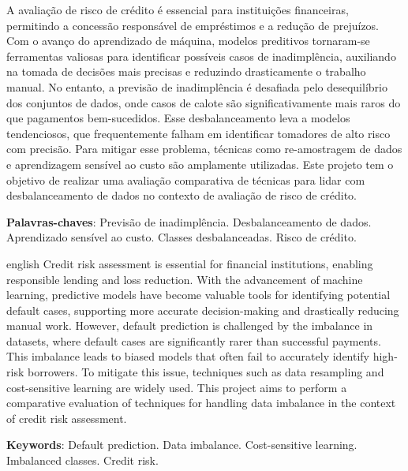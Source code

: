 
\setlength{\absparsep}{18pt} %
\begin{resumo}
  A avaliação de risco de crédito é essencial para instituições financeiras,
  permitindo a concessão responsável de empréstimos e a redução de
  prejuízos. Com
  o avanço do aprendizado de máquina, modelos preditivos tornaram-se
  ferramentas valiosas para identificar possíveis casos de
  inadimplência, auxiliando
  na tomada de decisões mais precisas e reduzindo drasticamente o
  trabalho manual.
  No entanto, a previsão de inadimplência é desafiada pelo
  desequilíbrio dos conjuntos
  de dados, onde casos de calote são significativamente mais raros do que
  pagamentos bem-sucedidos. Esse desbalanceamento leva a modelos tendenciosos,
  que frequentemente falham em identificar tomadores de alto risco com
  precisão. Para mitigar esse problema, técnicas como re-amostragem de dados e
  aprendizagem sensível ao custo são amplamente utilizadas. Este projeto tem o
  objetivo de realizar uma avaliação comparativa de técnicas para
  lidar com desbalanceamento
  de dados no contexto de avaliação de risco de crédito.

  \textbf{Palavras-chaves}: Previsão de inadimplência. Desbalanceamento de
  dados. Aprendizado sensível ao custo. Classes desbalanceadas. Risco
  de crédito.
\end{resumo}

\begin{resumo}
  [Abstract]
  \begin{otherlanguage*}
    {english} Credit risk assessment is essential for financial institutions,
    enabling responsible lending and loss reduction. With the advancement of
    machine learning, predictive models have become valuable tools for
    identifying potential default cases, supporting more accurate
    decision-making
    and drastically reducing manual work. However, default prediction
    is challenged
    by the imbalance in datasets, where default cases are significantly
    rarer than successful payments. This imbalance leads to biased models that
    often fail to accurately identify high-risk borrowers. To mitigate this
    issue, techniques such as data resampling and cost-sensitive learning are
    widely used. This project aims to perform a comparative evaluation of
    techniques for handling data imbalance in the context of credit risk
    assessment.

    \vspace{\onelineskip}

    \noindent
    \textbf{Keywords}: Default prediction. Data imbalance.
    Cost-sensitive learning.
    Imbalanced classes. Credit risk.
  \end{otherlanguage*}
\end{resumo}
